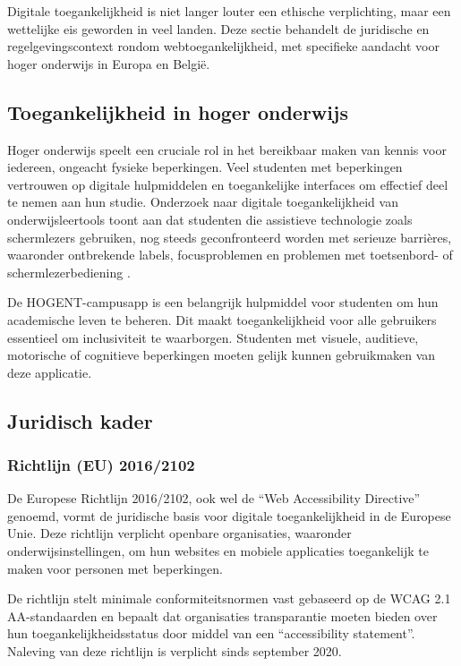 Digitale toegankelijkheid is niet langer louter een ethische verplichting, maar een wettelijke eis geworden in veel landen. Deze sectie behandelt de juridische en regelgevingscontext rondom webtoegankelijkheid, met specifieke aandacht voor hoger onderwijs in Europa en België.

\subsection{Toegankelijkheid in hoger onderwijs}
\label{subsec:toegankelijkheid-onderwijs}

Hoger onderwijs speelt een cruciale rol in het bereikbaar maken van kennis voor iedereen, ongeacht fysieke beperkingen. Veel studenten met beperkingen vertrouwen op digitale hulpmiddelen en toegankelijke interfaces om effectief deel te nemen aan hun studie. Onderzoek naar digitale toegankelijkheid van onderwijsleertools toont aan dat studenten die assistieve technologie zoals schermlezers gebruiken, nog steeds geconfronteerd worden met serieuze barrières, waaronder ontbrekende labels, focusproblemen en problemen met toetsenbord- of schermlezerbediening \autocite{Koob2022}.

De HOGENT-campusapp is een belangrijk hulpmiddel voor studenten om hun academische leven te beheren. Dit maakt toegankelijkheid voor alle gebruikers essentieel om inclusiviteit te waarborgen. Studenten met visuele, auditieve, motorische of cognitieve beperkingen moeten gelijk kunnen gebruikmaken van deze applicatie.

\subsection{Juridisch kader}
\label{subsec:juridisch-kader}

\subsubsection{Richtlijn (EU) 2016/2102}

De Europese Richtlijn 2016/2102, ook wel de ``Web Accessibility Directive'' genoemd, vormt de juridische basis voor digitale toegankelijkheid in de Europese Unie. Deze richtlijn verplicht openbare organisaties, waaronder onderwijsinstellingen, om hun websites en mobiele applicaties toegankelijk te maken voor personen met beperkingen.

De richtlijn stelt minimale conformiteitsnormen vast gebaseerd op de WCAG 2.1 AA-standaarden en bepaalt dat organisaties transparantie moeten bieden over hun toegankelijkheidsstatus door middel van een ``accessibility statement''. Naleving van deze richtlijn is verplicht sinds september 2020.

